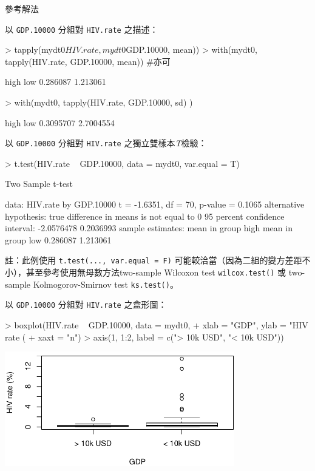 \documentclass[14pt, aspectratio=43]{beamer}
\begin{document}
\begin{frame}{參考解法}
\framebreak 

以 \verb+GDP.10000+ 分組對 \verb+HIV.rate+ 之描述：
\begin{RC}
> tapply(mydt0$HIV.rate, mydt0$GDP.10000, mean))
> with(mydt0, {tapply(HIV.rate, GDP.10000, mean)}) #亦可
\end{RC}
\begin{R}
    high      low 
0.286087 1.213061 
\end{R}
\begin{RC}
> with(mydt0, {tapply(HIV.rate, GDP.10000, sd)} )
\end{RC}
\begin{R}
     high       low 
0.3095707 2.7004554 
\end{R}

\framebreak

以 \verb+GDP.10000+ 分組對 \verb+HIV.rate+ 之獨立雙樣本\emph{T}檢驗：
\begin{RC}
> t.test(HIV.rate ~ GDP.10000,
         data = mydt0, var.equal = T)
\end{RC}
\begin{R}
	Two Sample t-test

data:  HIV.rate by GDP.10000
t = -1.6351, df = 70, p-value = 0.1065
alternative hypothesis: true difference in means is not equal to 0
95 percent confidence interval:
 -2.0576478  0.2036993
sample estimates:
mean in group high  mean in group low 
          0.286087           1.213061
\end{R}

\begin{minipage}{1\textwidth}
\tiny 註：此例使用 \verb+t.test(..., var.equal = F)+ 可能較洽當（因為二組的變方差距不小），甚至參考使用無母數方法two-sample Wilcoxon test \verb+wilcox.test()+ 或 two-sample Kolmogorov-Smirnov test \verb+ks.test()+。
\end{minipage}

\framebreak

以 \verb+GDP.10000+ 分組對 \verb+HIV.rate+ 之盒形圖：
\begin{RC}
> boxplot(HIV.rate ~ GDP.10000, data = mydt0,
+         xlab = "GDP", ylab = "HIV rate (%
+         xaxt = "n")
> axis(1, 1:2, label = c("> 10k USD", "< 10k USD"))
\end{RC}
\begin{center}\includegraphics[width=0.75\textwidth]{Rplot-test-two-group.pdf}\end{center}


\end{frame}
\end{document}
